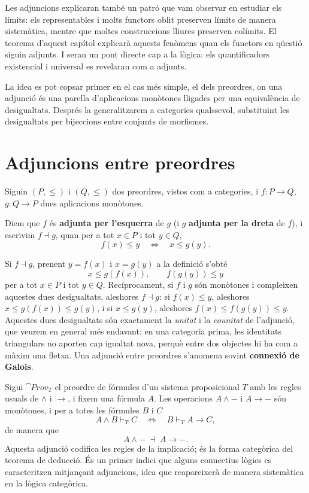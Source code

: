 Les adjuncions explicaran també un patró que vam observar en estudiar els límits: els representables i molts functors oblit preserven límits de manera sistemàtica, mentre que moltes construccions lliures preserven colímits. El teorema d'aquest capítol explicarà aquests fenòmens quan els functors en qüestió siguin adjunts. I seran un pont directe cap a la lògica: els quantificadors existencial i universal es revelaran com a adjunts.

La idea es pot copsar primer en el cas més simple, el dels preordres, on una adjunció és una parella d'aplicacions monòtones lligades per una equivalència de desigualtats. Després la generalitzarem a categories qualssevol, substituint les desigualtats per bijeccions entre conjunts de morfismes.

\section{Adjuncions entre preordres}

Siguin $(P,\leq)$ i $(Q,\leq)$ dos preordres, vistos com a categories, i $f\colon P\to Q$, $g\colon Q\to P$ dues aplicacions monòtones.

\begin{definicio}
Diem que $f$ és \textbf{adjunta per l'esquerra} de $g$ (i $g$ \textbf{adjunta per la dreta} de $f$), i escrivim $f\dashv g$, quan per a tot $x\in P$ i tot $y\in Q$,
\[
f(x)\leq y
\quad\Longleftrightarrow\quad
x\leq g(y).
\]
\end{definicio}

\begin{observacio}
Si $f\dashv g$, prenent $y=f(x)$ i $x=g(y)$ a la definició s'obté
\[
x\leq g(f(x)),
\qquad
f(g(y))\leq y
\]
per a tot $x\in P$ i tot $y\in Q$. Recíprocament, si $f$ i $g$ són monòtones i compleixen aquestes dues desigualtats, aleshores $f\dashv g$: si $f(x)\leq y$, aleshores $x\leq g(f(x))\leq g(y)$, i si $x\leq g(y)$, aleshores $f(x)\leq f(g(y))\leq y$. Aquestes dues desigualtats són exactament la \emph{unitat} i la \emph{counitat} de l'adjunció, que veurem en general més endavant; en una categoria prima, les identitats triangulars no aporten cap igualtat nova, perquè entre dos objectes hi ha com a màxim una fletxa. Una adjunció entre preordres s'anomena sovint \textbf{connexió de Galois}.
\end{observacio}

\begin{exemple}
Sigui $\cat{Prov}_T$ el preordre de fórmules d'un sistema proposicional $T$ amb les regles usuals de $\wedge$ i $\to$, i fixem una fórmula $A$. Les operacions $A\wedge-$ i $A\to-$ són monòtones, i per a totes les fórmules $B$ i $C$
\[
A\wedge B\vdash_T C
\quad\Longleftrightarrow\quad
B\vdash_T A\to C,
\]
de manera que
\[
A\wedge-\;\dashv\;A\to-.
\]
Aquesta adjunció codifica les regles de la implicació; és la forma categòrica del teorema de deducció. És un primer indici que alguns connectius lògics es caracteritzen mitjançant adjuncions, idea que reapareixerà de manera sistemàtica en la lògica categòrica.
\end{exemple}

